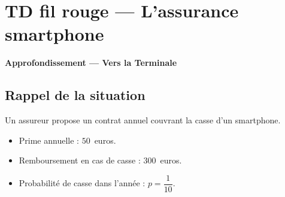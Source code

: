 

\section*{TD fil rouge — L'assurance smartphone}

\begin{center}\textbf{Approfondissement — Vers la Terminale}\end{center}

\subsection*{Rappel de la situation}

Un assureur propose un contrat annuel couvrant la casse d'un smartphone.
\begin{itemize}
  \item Prime annuelle : $50$~euros.
  \item Remboursement en cas de casse : $300$~euros.
  \item Probabilité de casse dans l'année : $p = \dfrac{1}{10}$.
\end{itemize}

